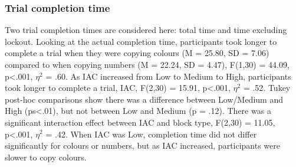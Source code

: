 \subsubsection{Trial completion time}
Two trial completion times are considered here: total time and time excluding lockout. 
Looking at the actual completion time, participants took longer to complete a trial when they were copying colours (M = 25.80, SD = 7.06) compared to when copying numbers (M = 22.24, SD = 4.47), F(1,30) = 44.09, p<.001, $\eta^2$ = .60. As IAC increased from Low to Medium to High, participants took longer to complete a trial, IAC, F(2,30) = 15.91, p<.001, $\eta^2$ = .52. Tukey post-hoc comparisons show there was a difference between Low/Medium and High (ps<.01), but not between Low and Medium (p = .12). There was a significant interaction effect between IAC and block type, F(2,30) = 11.05, p<.001, $\eta^2$ = .42. When IAC was Low, completion time did not differ significantly for colours or numbers, but as IAC increased, participants were slower to copy colours.

